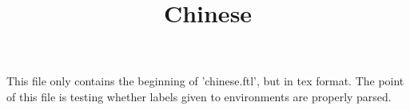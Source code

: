 \documentclass[a4paper,draft]{amsproc}
\title{\textbf{Chinese}}
\date{}
\begin{document}
\theoremstyle{plain}
 \newtheorem{theorem}{Theorem}[section]
 \newtheorem{lemma}{Theorem}[section]
 \newtheorem{proposition}{Theorem}[section]
\theoremstyle{definition}
 \newtheorem{example}{Example}[section]
 \newtheorem{definition}{Definition}[section]
 \newtheorem{signature}{Signature}[section]
\theoremstyle{remark}
 \newtheorem{remark}{Remark}[section]
 \newtheorem{notation}{Notation}[section]
\theoremstyle{axiom}
 \newtheorem{axiom}{Axiom}[section]

\newenvironment{forthel}{}{}
\maketitle

This file only contains the beginning of 'chinese.ftl', but in tex format. The point of this file is testing whether labels given to environments are properly parsed.
\end{document}
